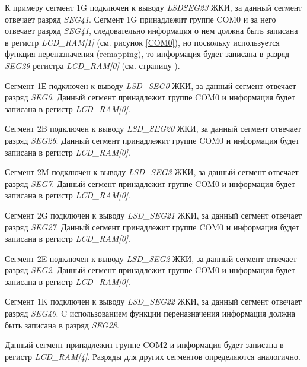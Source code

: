 К примеру сегмент 1G подключен к выводу \textit{LSDSEG23} ЖКИ, за данный сегмент отвечает разряд \textit{SEG41}. Сегмент 1G принадлежит группе COM0 и за него отвечает разряд \textit{SEG41}, следовательно информация о нем должна быть записана в регистр \textit{LCD\_RAM[1]} (см. рисунок \ref{COM0}), но поскольку используется функция переназначения (remapping), то информация будет записана в разряд \textit{SEG29} регистра \textit{LCD\_RAM[0]} (см. страницу \pageref{RegMemLCD}). 

Сегмент 1Е подключен к выводу \textit{LSD\_SEG0} ЖКИ, за данный сегмент отвечает разряд \textit{SEG0}. Данный сегмент принадлежит группе COM0 и информация будет записана в регистр \textit{LCD\_RAM[0]}.

Сегмент 2B подключен к выводу \textit{LSD\_SEG20} ЖКИ, за данный сегмент отвечает разряд \textit{SEG26}. Данный сегмент принадлежит группе COM0 и информация будет записана в регистр \textit{LCD\_RAM[0]}.

Сегмент 2M подключен к выводу \textit{LSD\_SEG3} ЖКИ, за данный сегмент отвечает разряд \textit{SEG7}. Данный сегмент принадлежит группе COM0 и информация будет записана в регистр \textit{LCD\_RAM[0]}.

Сегмент 2G подключен к выводу \textit{LSD\_SEG21} ЖКИ, за данный сегмент отвечает разряд \textit{SEG27}. Данный сегмент принадлежит группе COM0 и информация будет записана в регистр \textit{LCD\_RAM[0]}.

Сегмент 2E подключен к выводу \textit{LSD\_SEG2} ЖКИ, за данный сегмент отвечает разряд \textit{SEG2}. Данный сегмент принадлежит группе COM0 и информация будет записана в регистр \textit{LCD\_RAM[0]}. 

Сегмент 1K подключен к выводу \textit{LSD\_SEG22} ЖКИ, за данный сегмент отвечает разряд \textit{SEG40}. C использованием функции переназначения информация должна быть записана в разряд \textit{SEG28}. 

Данный сегмент принадлежит группе COM2 и информация будет записана в регистр \textit{LCD\_RAM[4]}. 
Разряды для других сегментов определяются аналогично.

